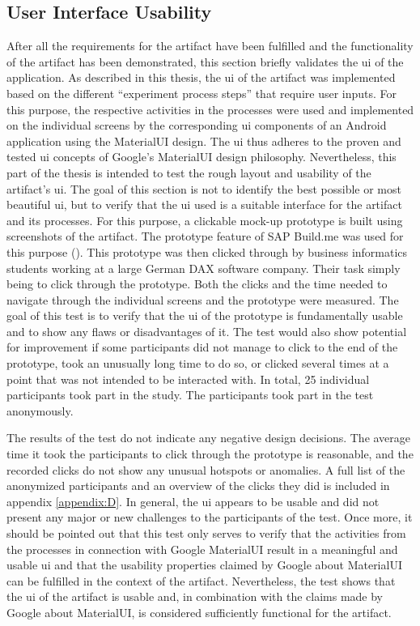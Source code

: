 \subsection{User Interface Usability}

After all the requirements for the artifact have been fulfilled and the functionality of the artifact has been demonstrated, this section briefly validates the \ac{ui} of the application. As described in this thesis, the \ac{ui} of the artifact was implemented based on the different \enquote{experiment process steps} that require user inputs. For this purpose, the respective activities in the processes were used and implemented on the individual screens by the corresponding \ac{ui} components of an Android application using the MaterialUI design. The \ac{ui} thus adheres to the proven and tested \ac{ui} concepts of Google's MaterialUI design philosophy. Nevertheless, this part of the thesis is intended to test the rough layout and usability of the artifact's \ac{ui}. The goal of this section is not to identify the best possible or most beautiful \ac{ui}, but to verify that the \ac{ui} used is a suitable interface for the artifact and its processes. For this purpose, a clickable mock-up prototype is built using screenshots of the artifact. The prototype feature of SAP Build.me was used for this purpose (\cite{SAP.2023}). This prototype was then clicked through by business informatics students working at a large German DAX software company. Their task simply being to click through the prototype. Both the clicks and the time needed to navigate through the individual screens and the prototype were measured. The goal of this test is to verify that the \ac{ui} of the prototype is fundamentally usable and to show any flaws or disadvantages of it. The test would also show potential for improvement if some participants did not manage to click to the end of the prototype, took an unusually long time to do so, or clicked several times at a point that was not intended to be interacted with. In total, 25 individual participants took part in the study. The participants took part in the test anonymously. 

The results of the test do not indicate any negative design decisions. The average time it took the participants to click through the prototype is reasonable, and the recorded clicks do not show any unusual hotspots or anomalies. A full list of the anonymized participants and an overview of the clicks they did is included in appendix \ref{appendix:D}. In general, the \ac{ui} appears to be usable and did not present any major or new challenges to the participants of the test. Once more, it should be pointed out that this test only serves to verify that the activities from the processes in connection with Google MaterialUI result in a meaningful and usable \ac{ui} and that the usability properties claimed by Google about MaterialUI can be fulfilled in the context of the artifact. Nevertheless, the test shows that the \ac{ui} of the artifact is usable and, in combination with the claims made by Google about MaterialUI, is considered sufficiently functional for the artifact.
